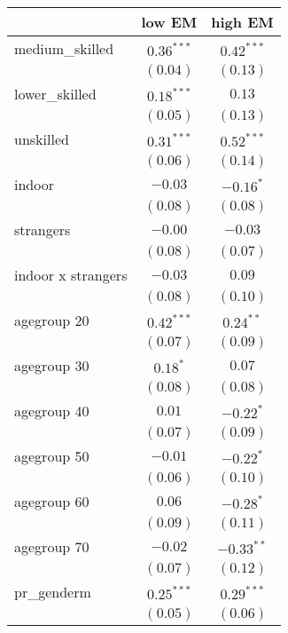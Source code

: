 
\begin{table}
\begin{center}
\begin{tabular}{l c c }
\hline
 & low EM & high EM \\
\hline
medium\_skilled    & $0.36^{***}$ & $0.42^{***}$  \\
                   & $(0.04)$     & $(0.13)$      \\
lower\_skilled     & $0.18^{***}$ & $0.13$        \\
                   & $(0.05)$     & $(0.13)$      \\
unskilled          & $0.31^{***}$ & $0.52^{***}$  \\
                   & $(0.06)$     & $(0.14)$      \\
indoor             & $-0.03$      & $-0.16^{*}$   \\
                   & $(0.08)$     & $(0.08)$      \\
strangers          & $-0.00$      & $-0.03$       \\
                   & $(0.08)$     & $(0.07)$      \\
indoor x strangers & $-0.03$      & $0.09$        \\
                   & $(0.08)$     & $(0.10)$      \\
agegroup 20        & $0.42^{***}$ & $0.24^{**}$   \\
                   & $(0.07)$     & $(0.09)$      \\
agegroup 30        & $0.18^{*}$   & $0.07$        \\
                   & $(0.08)$     & $(0.08)$      \\
agegroup 40        & $0.01$       & $-0.22^{*}$   \\
                   & $(0.07)$     & $(0.09)$      \\
agegroup 50        & $-0.01$      & $-0.22^{*}$   \\
                   & $(0.06)$     & $(0.10)$      \\
agegroup 60        & $0.06$       & $-0.28^{*}$   \\
                   & $(0.09)$     & $(0.11)$      \\
agegroup 70        & $-0.02$      & $-0.33^{**}$  \\
                   & $(0.07)$     & $(0.12)$      \\
pr\_genderm        & $0.25^{***}$ & $0.29^{***}$  \\
                   & $(0.05)$     & $(0.06)$      \\

\end{tabular}
\end{center}
\end{table}
